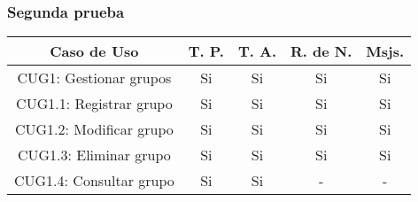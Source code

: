 \subsubsection{Segunda prueba}
\begin{center}
	\begin{tabular}{ |c|c|c|c|c| } 
		\hline
		Caso de Uso & T. P. & T. A. & R. de N. & Msjs. \\
		\hline 
		CUG1: Gestionar grupos & Si & Si & Si & Si \\ 
		CUG1.1: Registrar grupo & Si & Si & Si & Si \\ 
		CUG1.2: Modificar grupo & Si & Si & Si & Si \\ 
		CUG1.3: Eliminar grupo & Si & Si & Si & Si \\ 
		CUG1.4: Consultar grupo & Si & Si & - & - \\
		\hline
	\end{tabular}
\end{center}
